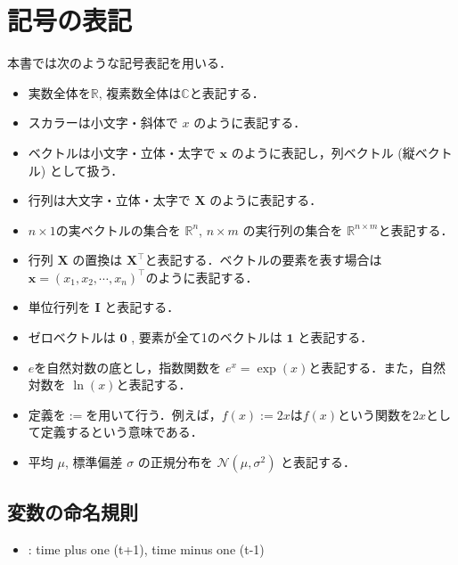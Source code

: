 \section{記号の表記}
本書では次のような記号表記を用いる．
\begin{itemize}
\item 実数全体を$\mathbb{R}$, 複素数全体は$\mathbb{C}$と表記する．
\item スカラーは小文字・斜体で $x$ のように表記する．
\item ベクトルは小文字・立体・太字で $\mathbf{x}$ のように表記し，列ベクトル (縦ベクトル) として扱う．
\item 行列は大文字・立体・太字で $\mathbf{X}$ のように表記する．
\item $n\times 1$の実ベクトルの集合を $\mathbb{R}^n$, $n\times m$ の実行列の集合を $\mathbb{R}^{n\times m}$と表記する．
\item 行列 $\mathbf{X}$ の置換は $\mathbf{X}^\top$と表記する．ベクトルの要素を表す場合は $\mathbf{x} = (x_1, x_2,\cdots, x_n)^\top$のように表記する．
\item 単位行列を $\mathbf{I}$ と表記する．
\item ゼロベクトルは $\mathbf{0}$ , 要素が全て1のベクトルは $\mathbf{1}$ と表記する．  
\item $e$を自然対数の底とし，指数関数を $e^x=\exp(x)$と表記する．また，自然対数を $\ln(x)$と表記する．
\item 定義を$:=$を用いて行う．例えば，$f(x):=2x$は$f(x)$という関数を$2x$として定義するという意味である．
\item 平均 $\mu$, 標準偏差 $\sigma$ の正規分布を $\mathcal{N}(\mu, \sigma^2)$ と表記する．
\end{itemize}
\subsection{変数の命名規則}
\begin{itemize}
\item {} : time plus one (t+1), time minus one (t-1)
\end{itemize}
